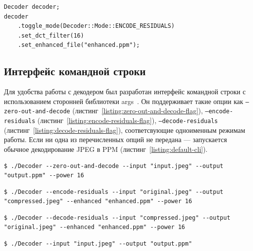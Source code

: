 \documentclass[times,specification,annotation]{itmo-student-thesis}
\begin{document}
\begin{lstlisting}[float=!h,caption={Пример создания и настройки декодера},label={listing:decoder-configuration-example}]
Decoder decoder;
decoder
    .toggle_mode(Decoder::Mode::ENCODE_RESIDUALS)
    .set_dct_filter(16)
    .set_enhanced_file("enhanced.ppm");
\end{lstlisting}

\subsection{Интерфейс командной строки}\label{subsection:decoder-cli}

Для удобства работы с декодером был разработан интерфейс командной строки с использованием сторонней библиотеки args~\cite{args-lib}. Он поддерживает такие опции как \texttt{--zero-out-and-decode} (листинг~\ref{listing:zero-out-and-decode-flag}), \texttt{--encode-residuals} (листинг~\ref{listing:encode-residuals-flag}), \texttt{--decode-residuals} (листинг~\ref{listing:decode-residuals-flag}), соответсвующие одноименным режимам работы. Если ни одна из перечисленных опций не передана --- запускается обычное декодирование JPEG в PPM (листинг~\ref{listing:default-cli}).

\begin{lstlisting}[float=!h,caption={Пример вызова декодера для декодирования JPEG с частичным обнулением коэффициентов ДКП},label={listing:zero-out-and-decode-flag}]
$ ./Decoder --zero-out-and-decode --input "input.jpeg" --output "output.ppm" --power 16
\end{lstlisting}

\begin{lstlisting}[float=!h,caption={Пример вызова декодера для транскодирования},label={listing:encode-residuals-flag}]
$ ./Decoder --encode-residuals --input "original.jpeg" --output "compressed.jpeg" --enhanced "enhanced.ppm" --power 16
\end{lstlisting}

\begin{lstlisting}[float=!h,caption={Пример вызова декодера для трансдекодирования},label={listing:decode-residuals-flag}]
$ ./Decoder --decode-residuals --input "compressed.jpeg" --output "original.jpeg" --enhanced "enhanced.ppm" --power 16
\end{lstlisting}

\begin{lstlisting}[float=!h,caption={Пример вызова декодера для декодирования JPEG},label={listing:default-cli}]
$ ./Decoder --input "input.jpeg" --output "output.ppm"
\end{lstlisting}
\end{document}
